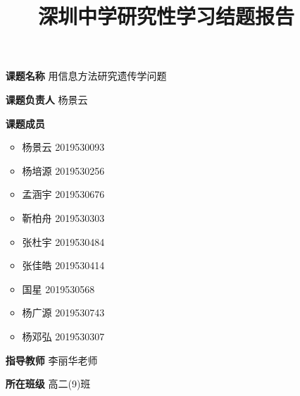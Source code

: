 \documentclass[12pt]{article} %
\title{深圳中学研究性学习结题报告}
\author{}
\begin{document}
	
\maketitle

\begin{itemize}
	\item[\textbf{课题名称}] 用信息方法研究遗传学问题 \centering
	\item[\textbf{课题负责人}] 杨景云
	\item[\textbf{课题成员}]{ 
		\begin{itemize} 
			\item 杨景云 2019530093 \centering
			\item 杨培源 2019530256
			\item 孟涵宇 2019530676
			\item 靳柏舟 2019530303
			\item 张杜宇 2019530484
			\item 张佳皓 2019530414
			\item 国星 2019530568
			\item 杨广源 2019530743
			\item 杨邓弘 2019530307
		\end{itemize}
	}\centering
	\item[\textbf{指导教师}] 李丽华老师
	\item[\textbf{所在班级}] 高二(9)班
\end{itemize}

\newpage
\end{document}
